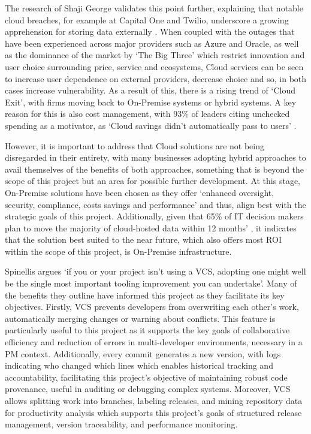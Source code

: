 \documentclass{report}
\begin{document}
The research of Shaji George validates this point further, explaining that notable cloud breaches, for example at Capital One and Twilio, underscore a growing apprehension for storing data externally \parencite{georgeCloudComedownUnderstanding2024}. 
When coupled with the outages that have been experienced across major providers such as Azure and Oracle, as well as the dominance of the market by `The Big Three' which restrict innovation and user choice surrounding price, service and ecosystems, Cloud services can be seen to increase user dependence on external providers, decrease choice and so, in both cases increase vulnerability. 
As a result of this, there is a rising trend of `Cloud Exit', with firms moving back to On-Premise systems or hybrid systems. 
A key reason for this is also cost management, with 93\% of leaders citing unchecked spending as a motivator, as `Cloud savings didn't automatically pass to users' \parencite{georgeCloudComedownUnderstanding2024}. 

However, it is important to address that Cloud solutions are not being disregarded in their entirety, with many businesses adopting hybrid approaches to avail themselves of the benefits of both approaches, something that is beyond the scope of this project but an area for possible further development. 
At this stage, On-Premise solutions have been chosen as they offer `enhanced oversight, security, compliance, costs savings and performance' \parencite{georgeCloudComedownUnderstanding2024} and thus, align best with the strategic goals of this project. 
Additionally, given that 65\% of IT decision makers plan to move the majority of cloud-hosted data within 12 months' \parencite{georgeCloudComedownUnderstanding2024}, it indicates that the solution best suited to the near future, which also offers most ROI within the scope of this project, is On-Premise infrastructure. 


Spinellis argues `if you or your project isn't using a VCS, adopting one might well be the single most important tooling improvement you can undertake'\parencite{spinellisVersionControlSystems2005}. 
Many of the benefits they outline have informed this project as they facilitate its key objectives. 
Firstly, VCS prevents developers from overwriting each other's work, automatically merging changes or warning about conflicts. 
This feature is particularly useful to this project as it supports the key goals of collaborative efficiency and reduction of errors in multi-developer environments, necessary in a PM context. 
Additionally, every commit generates a new version, with logs indicating who changed which lines which enables historical tracking and accountability, facilitating this project's objective of maintaining robust code provenance, useful in auditing or debugging complex systems. 
Moreover, VCS allows splitting work into branches, labeling releases, and mining repository data for productivity analysis which supports this project's goals of structured release management, version traceability, and performance monitoring. 
\end{document}
